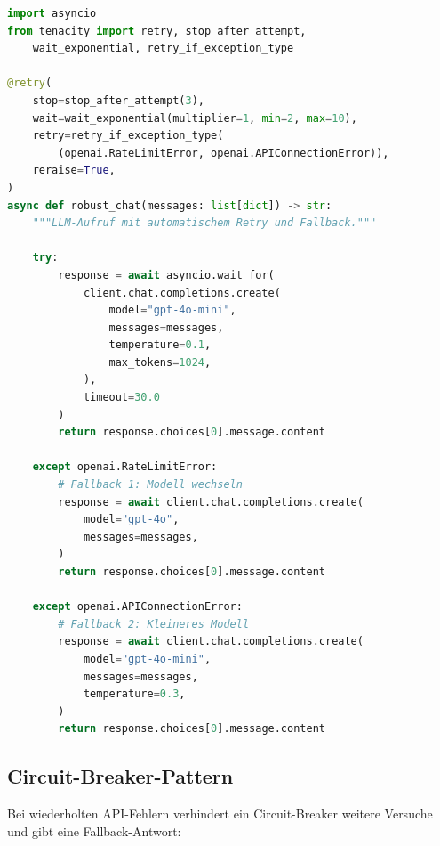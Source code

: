 \begin{lstlisting}[language=Python, caption=Fehlertolerante LLM-Aufrufe mit Retry und Fallback]
import asyncio
from tenacity import retry, stop_after_attempt,
    wait_exponential, retry_if_exception_type

@retry(
    stop=stop_after_attempt(3),
    wait=wait_exponential(multiplier=1, min=2, max=10),
    retry=retry_if_exception_type(
        (openai.RateLimitError, openai.APIConnectionError)),
    reraise=True,
)
async def robust_chat(messages: list[dict]) -> str:
    """LLM-Aufruf mit automatischem Retry und Fallback."""

    try:
        response = await asyncio.wait_for(
            client.chat.completions.create(
                model="gpt-4o-mini",
                messages=messages,
                temperature=0.1,
                max_tokens=1024,
            ),
            timeout=30.0
        )
        return response.choices[0].message.content

    except openai.RateLimitError:
        # Fallback 1: Modell wechseln
        response = await client.chat.completions.create(
            model="gpt-4o",
            messages=messages,
        )
        return response.choices[0].message.content

    except openai.APIConnectionError:
        # Fallback 2: Kleineres Modell
        response = await client.chat.completions.create(
            model="gpt-4o-mini",
            messages=messages,
            temperature=0.3,
        )
        return response.choices[0].message.content
\end{lstlisting}

\subsection{Circuit-Breaker-Pattern}

Bei wiederholten API-Fehlern verhindert ein Circuit-Breaker weitere Versuche und gibt eine Fallback-Antwort:

